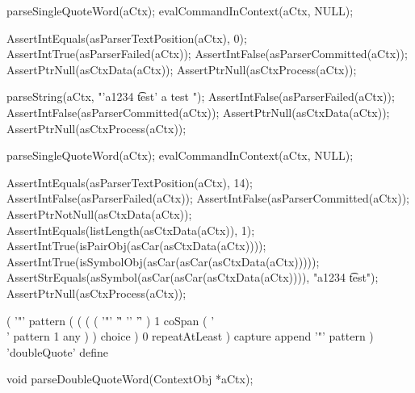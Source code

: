   parseSingleQuoteWord(aCtx);
  evalCommandInContext(aCtx, NULL);
  
  AssertIntEquals(asParserTextPosition(aCtx), 0);
  AssertIntTrue(asParserFailed(aCtx));
  AssertIntFalse(asParserCommitted(aCtx));
  AssertPtrNull(asCtxData(aCtx));
  AssertPtrNull(asCtxProcess(aCtx));
\stopCTest
\stopTestCase

\startCTest
  parseString(aCtx, "'a1234 \t test' a test ");
  AssertIntFalse(asParserFailed(aCtx));
  AssertIntFalse(asParserCommitted(aCtx));
  AssertPtrNull(asCtxData(aCtx));
  AssertPtrNull(asCtxProcess(aCtx));
  
  parseSingleQuoteWord(aCtx);
  evalCommandInContext(aCtx, NULL);
  
  AssertIntEquals(asParserTextPosition(aCtx), 14);
  AssertIntFalse(asParserFailed(aCtx));
  AssertIntFalse(asParserCommitted(aCtx));
  AssertPtrNotNull(asCtxData(aCtx));
  AssertIntEquals(listLength(asCtxData(aCtx)), 1);
  AssertIntTrue(isPairObj(asCar(asCtxData(aCtx))));
  AssertIntTrue(isSymbolObj(asCar(asCar(asCtxData(aCtx)))));
  AssertStrEquals(asSymbol(asCar(asCar(asCtxData(aCtx)))), "a1234 \t test");
  AssertPtrNull(asCtxProcess(aCtx));
\stopCTest
\stopTestCase
\stopTestSuite

\startTestSuite[parseDoubleQuoteWord]

\starttyping
(
  '"' pattern
  (
    ( 
      (
        ( '"' '\r' '\n' '\f' ) 1 coSpan
        ( '\\' pattern 1 any )
      ) choice
    ) 0 repeatAtLeast
  ) capture append
  '"' pattern
) 'doubleQuote' define
\stoptyping

\startCHeader
void parseDoubleQuoteWord(ContextObj *aCtx);
\stopCHeader

